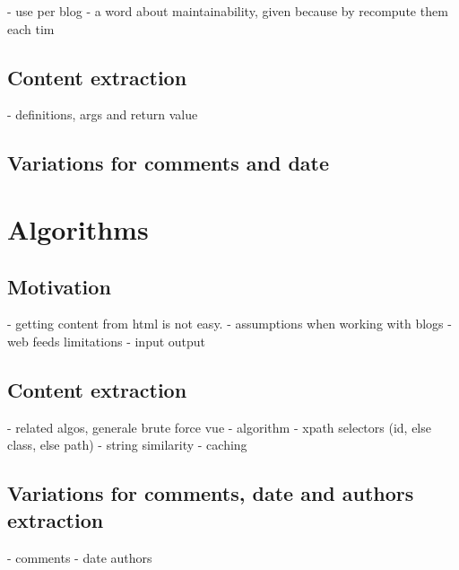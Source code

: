 - use per blog
- a word about maintainability, given because by recompute them each tim


\subsection{Content extraction}
- definitions, args and return value \\

\subsection{Variations for comments and date}























\section{Algorithms}

\subsection{Motivation}
- getting content from html is not easy. \cite{w3c2002}
- assumptions when working with blogs
- web feeds limitations
- input output

\subsection{Content extraction}
- related algos, generale brute force vue
- algorithm
- xpath selectors (id, else class, else path)
- string similarity
- caching

\subsection{Variations for comments, date and authors extraction}
- comments
- date authors
